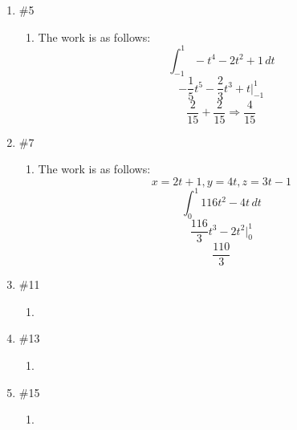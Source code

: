 \documentclass[12pt]{article}
\begin{document}
\begin{enumerate}
\begin{enumerate}
    \end{enumerate}

  \item \#5 \begin{enumerate}

			\item The work is as follows:
              $$\int_{-1}^1 -t^4-2t^2+1\,dt$$
              $$-\frac{1}{5}t^5-\frac{2}{3}t^3+t\Big|_{-1}^1$$
              $$\frac{2}{15}+\frac{2}{15}\Longrightarrow\frac{4}{15}$$

        \end{enumerate}

    \item \#7 \begin{enumerate}

				\item The work is as follows:
                  $$x=2t+1,y=4t,z=3t-1$$
                  $$\int_0^1 116t^2-4t\,dt$$
                  $$\frac{116}{3}t^3-2t^2\Big|_0^1$$
                  $$\frac{110}{3}$$


      \end{enumerate}

    \item \#11 \begin{enumerate}

        \item 

      \end{enumerate}

    \item \#13 \begin{enumerate}

        \item 

      \end{enumerate}

    \item \#15 \begin{enumerate}

        \item  

      \end{enumerate}

	
\end{enumerate}
\end{document}
